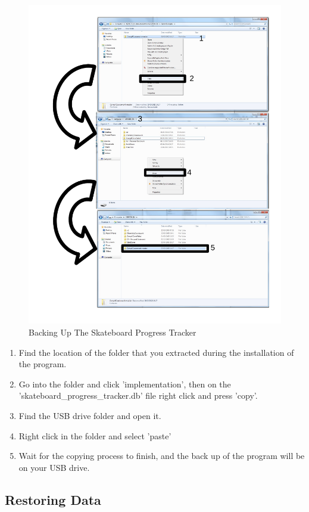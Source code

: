 \begin{figure}[H]
    \includegraphics[width=\textwidth]{./Manual/Images/BackUp.pdf}
    \caption{Backing Up The Skateboard Progress Tracker} \label{fig:BackUp}
\end{figure}

\begin{enumerate}
\item Find the location of the folder that you extracted during the installation of the program.
\item Go into the folder and click 'implementation', then on the 'skateboard_progress_tracker.db' file right click and press 'copy'.
\item Find the USB drive folder and open it.
\item Right click in the folder and select 'paste' 
\item Wait for the copying process to finish, and the back up of the program will be on your USB drive.
\end{enumerate}

\subsection{Restoring Data}

